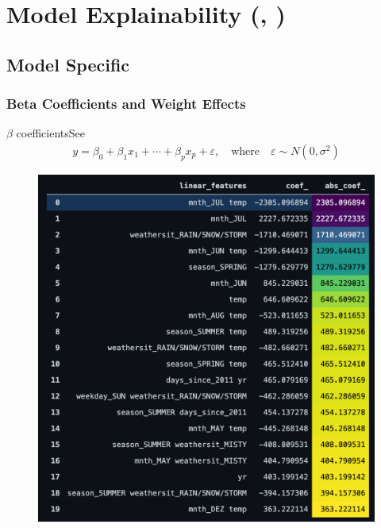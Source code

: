 \documentclass[10pt]{beamer}
\begin{document}
\section{Model Explainability (\cite{molnar2019}, \cite{masis2021})}

\subsection{Model Specific} 

\subsubsection{Beta Coefficients and Weight Effects}

\begin{frame}{$\beta$ coefficients}{See \cite[Section 5.1]{molnar2019}}
\begin{align*}
y = \beta_{0} + \beta_{1}x_{1} + \cdots + \beta_{p}x_{p} + \varepsilon, \quad \text{where} \quad \varepsilon \sim N(0, \sigma^2)
\end{align*}
\begin{center}
  \begin{figure}
    \includegraphics[scale=0.3]{images/lm_beta_table.png} 
  \end{figure}
\end{center}
\end{frame}
\end{document}
